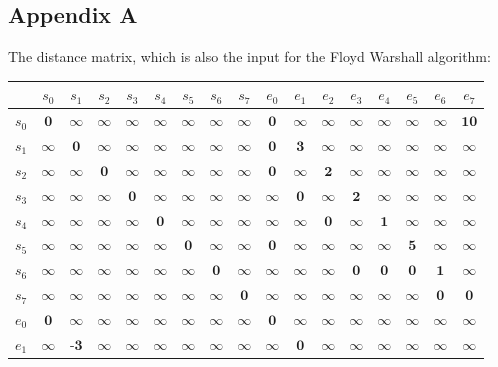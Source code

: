 \documentclass{article}
\theoremstyle{definition}
\begin{document}
\subsection{Appendix A}
\label{appendix:a}
\label{text:appendix}
The distance matrix, which is also the input for the Floyd Warshall algorithm:\\
\begin{tabular}{c | cccccccccccccccc}
	&$s_0$	&$s_1$ &$s_2$ &$s_3$ &$s_4$ &$s_5$ &$s_6$ &$s_7$ &$e_0$ &$e_1$ &$e_2$ &$e_3$ &$e_4$ &$e_5$ &$e_6$ &$e_7$\\
\hline
$s_0$	&$\textbf{0}$	&$\infty$	&$\infty$	&$\infty$	&$\infty$	&$\infty$	&$\infty$	&$\infty$	&$\textbf{0}$	&$\infty$	&$\infty$	&$\infty$	&$\infty$	&$\infty$	&$\infty$	&$\textbf{10}$\\
$s_1$	&$\infty$	&$\textbf{0}$	&$\infty$	&$\infty$	&$\infty$	&$\infty$	&$\infty$	&$\infty$	&$\textbf{0}$	&$\textbf{3}$	&$\infty$	&$\infty$	&$\infty$	&$\infty$	&$\infty$	&$\infty$\\
$s_2$	&$\infty$	&$\infty$	&$\textbf{0}$	&$\infty$	&$\infty$	&$\infty$	&$\infty$	&$\infty$	&$\textbf{0}$	&$\infty$	&$\textbf{2}$	&$\infty$	&$\infty$	&$\infty$	&$\infty$	&$\infty$\\
$s_3$	&$\infty$	&$\infty$	&$\infty$	&$\textbf{0}$	&$\infty$	&$\infty$	&$\infty$	&$\infty$	&$\infty$	&$\textbf{0}$	&$\infty$	&$\textbf{2}$	&$\infty$	&$\infty$	&$\infty$	&$\infty$\\
$s_4$	&$\infty$	&$\infty$	&$\infty$	&$\infty$	&$\textbf{0}$	&$\infty$	&$\infty$	&$\infty$	&$\infty$	&$\infty$	&$\textbf{0}$	&$\infty$	&$\textbf{1}$	&$\infty$	&$\infty$	&$\infty$\\
$s_5$	&$\infty$	&$\infty$	&$\infty$	&$\infty$	&$\infty$	&$\textbf{0}$	&$\infty$	&$\infty$	&$\textbf{0}$	&$\infty$	&$\infty$	&$\infty$	&$\infty$	&$\textbf{5}$	&$\infty$	&$\infty$\\
$s_6$	&$\infty$	&$\infty$	&$\infty$	&$\infty$	&$\infty$	&$\infty$	&$\textbf{0}$	&$\infty$	&$\infty$	&$\infty$	&$\infty$	&$\textbf{0}$	&$\textbf{0}$	&$\textbf{0}$	&$\textbf{1}$	&$\infty$\\
$s_7$	&$\infty$	&$\infty$	&$\infty$	&$\infty$	&$\infty$	&$\infty$	&$\infty$	&$\textbf{0}$	&$\infty$	&$\infty$	&$\infty$	&$\infty$	&$\infty$	&$\infty$	&$\textbf{0}$	&$\textbf{0}$\\
$e_0$	&$\textbf{0}$	&$\infty$	&$\infty$	&$\infty$	&$\infty$	&$\infty$	&$\infty$	&$\infty$	&$\textbf{0}$	&$\infty$	&$\infty$	&$\infty$	&$\infty$	&$\infty$	&$\infty$	&$\infty$\\
$e_1$	&$\infty$	&$\textbf{-3}$	&$\infty$	&$\infty$	&$\infty$	&$\infty$	&$\infty$	&$\infty$	&$\infty$	&$\textbf{0}$	&$\infty$	&$\infty$	&$\infty$	&$\infty$	&$\infty$	&$\infty$\\

\end{tabular}
\end{document}
